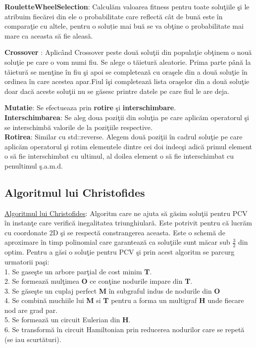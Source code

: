 \documentclass[11pt,leqno]{article}
\begin{document}
\par \textbf{RouletteWheelSelection}: Calcul\u am valoarea fitness pentru toate solu\c tiile \c si le atribuim fiec\u arei din ele o probabilitate care reflect\u a c\^ at de bun\u a este \^ in compara\c tie cu altele, pentru o soluție mai bu\u a se va ob\c tine o probabilitate mai mare ca aceasta s\u a fie aleas\u a.

\par \textbf{Crossover} : Aplic\^ and Crossover peste dou\u a solu\c tii din popula\c tie ob\c tinem o nou\u a solu\c tie pe care o vom numi fiu. Se alege o t\u aietur\u a aleatorie. Prima parte p\^ an\u a la t\u aietur\u a se men\c tine \^ in fiu \c si apoi se completeaz\u a cu ora\c sele din a dou\u a solu\c tie \^  in ordinea \^ in care acestea apar.Fiul \^ i\c si completeaz\u a lista ora\c selor din a dou\u a solu\c tie doar dac\u a aceste solu\c tii  nu se g\u asesc printre datele pe care fiul le are deja.

\textbf{Mutatie}: Se efectueaza prin \textbf{rotire} \c si \textbf{interschimbare}.
\\
\textbf{Interschimbarea}: Se aleg doua pozi\c tii din solu\c tia pe care aplic\u am operatorul \c si se interschimb\u a valorile de la pozi\c tiile respective.
\\
\textbf{Rotirea}: Similar cu std::reverse. Alegem dou\u a pozi\c tii \^ in cadrul solu\c tie pe care aplic\u am operatorul \c si rotim elementele dintre cei doi indec\c si adic\u a primul element o s\u a fie interschimbat cu ultimul, al doilea element o s\u a fie interschimbat cu penultimul \c s.a.m.d.
\\
 
\subsection{Algoritmul lui Christofides}
\uline{Algoritmul lui Christofides}: Algoritm care ne ajuta s\u a g\u asim solu\c tii pentru PCV \^ in instan\c te care verific\u a inegalitatea triunghiular\u a. Este potrivit pentru c\u a lucr\u am cu coordonate 2D \c si se respect\u a constrangerea aceasta. Este o schem\u a de aproximare \^ in timp polinomial care garanteaz\u a ca solu\c tiile sunt m\u acar sub $\frac{3}{2}$ din optim.  Pentru a g\u asi o solu\c tie pentru PCV \c si prin acest algoritm se parcurg urmatorii pa\c si:
\\
1. Se gase\c ste un arbore par\c tial de cost minim \textbf{T}.
\\
2. Se formeaz\u a mul\c timea \textbf{O} ce con\c tine nodurile impare din \textbf{T}.
\\
3. Se g\u ase\c ste un cuplaj perfect \textbf{M} \^ in subgraful indus de nodurile din \textbf{O}
\\
4. Se combin\u a muchiile lui \textbf{M} si \textbf{T} pentru a forma un multigraf \textbf{H} unde fiecare nod are grad par.
\\
5. Se formeaz\u a un circuit Eulerian din \textbf{H}.
\\
6. Se transform\u a \^ in circuit Hamiltonian prin reducerea nodurilor care se repet\u a (se iau scurt\u aturi).
\end{document}
